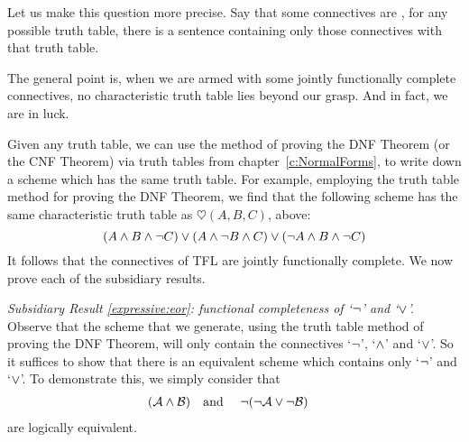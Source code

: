 Let us make this question more precise. Say that some connectives are  \emph{\ifeff}, for any possible truth table, there is a sentence containing only those connectives with that truth table.


The general point is, when we are armed with some jointly functionally complete connectives, no characteristic truth table lies beyond our grasp. And in fact, we are in luck.

Given any truth table, we can use the method of proving the DNF Theorem (or the CNF Theorem) via truth tables from chapter~\ref{c:NormalForms}, to write down a scheme which has the same truth table. For example, employing the truth table method for proving the DNF Theorem, we find that the following scheme has the same characteristic truth table as $\heartsuit(A,B,C)$, above:
		$$(A \wedge B \wedge \neg C) \vee (A \wedge \neg B \wedge C) \vee (\neg A \wedge B \wedge \neg C)$$			
It follows that the connectives of TFL are jointly functionally complete. We now prove each of the subsidiary results.
	
\emph{Subsidiary Result \ref{expressive:eor}: functional completeness of `$\neg$' and `$\vee$'.} Observe that the scheme that we generate, using the truth table method of proving the DNF Theorem, will only contain the connectives `$\neg$', `$\wedge$' and `$\vee$'. So it suffices to show that there is an equivalent scheme which contains only `$\neg$' and `$\vee$'. To demonstrate this, we simply consider that
		\begin{align*}
		(\mathcal{A} \wedge \mathcal{B}) & \text{\quad and \quad} \neg(\neg \mathcal{A} \vee\neg \mathcal{B})
		\end{align*}
		are logically equivalent.

